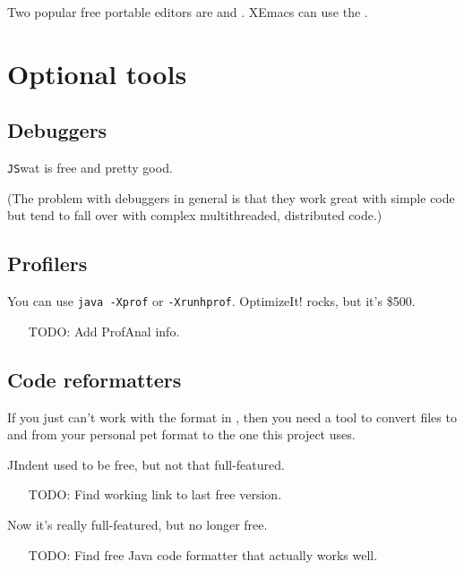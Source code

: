 \documentclass{article}
\begin{document}
Two popular free portable editors are  and 
. XEmacs can use the
.

\section{Optional tools}

\subsection{Debuggers}

\texttt{JS}wat is free and pretty good.

(The problem with debuggers in general is that they work great with simple 
code but tend to fall over with complex multithreaded, distributed code.)

\subsection{Profilers}

You can use \texttt{java -Xprof} or \texttt{-Xrunhprof}.
OptimizeIt! rocks, but it's \$500.
\begin{itemize}
\item[TODO:] Add ProfAnal info.
\end{itemize}

\subsection{Code reformatters}

If you just can't work with the format in
,
then you need a tool to convert files to and from your personal pet
format to the one this project uses.

JIndent used to be free, but not that full-featured. 
\begin{itemize}
\item[TODO:] Find working link to last free version.
\end{itemize}
Now it's really full-featured, but no longer free.
\begin{itemize}
\item[TODO:] Find free Java code formatter that actually works well.
\end{itemize}
\end{document}
